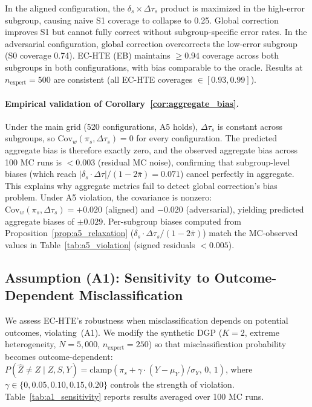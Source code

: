 In the aligned configuration, the $\delta_s \times \Delta\tau_s$ product is maximized in the high-error subgroup, causing naive S1 coverage to collapse to 0.25.
Global correction improves S1 but cannot fully correct without subgroup-specific error rates.
In the adversarial configuration, global correction overcorrects the low-error subgroup (S0 coverage 0.74).
EC-HTE (EB) maintains $\geq 0.94$ coverage across both subgroups in both configurations, with bias comparable to the oracle.
Results at $n_{\text{expert}}{=}500$ are consistent (all EC-HTE coverages $\in [0.93, 0.99]$).

\paragraph{Empirical validation of Corollary~\ref{cor:aggregate_bias}.}
Under the main grid (520 configurations, A5 holds), $\Delta\tau_s$ is constant across subgroups, so $\mathrm{Cov}_w(\pi_s, \Delta\tau_s) = 0$ for every configuration.
The predicted aggregate bias is therefore exactly zero, and the observed aggregate bias across 100 MC runs is $< 0.003$ (residual MC noise), confirming that subgroup-level biases (which reach $|\delta_s \cdot \Delta\tau|/(1-2\bar{\pi}) = 0.071$) cancel perfectly in aggregate.
This explains why aggregate metrics fail to detect global correction's bias problem.
Under A5 violation, the covariance is nonzero: $\mathrm{Cov}_w(\pi_s, \Delta\tau_s) = +0.020$ (aligned) and $-0.020$ (adversarial), yielding predicted aggregate biases of $\pm 0.029$.
Per-subgroup biases computed from Proposition~\ref{prop:a5_relaxation} ($\delta_s \cdot \Delta\tau_s / (1{-}2\bar{\pi})$) match the MC-observed values in Table~\ref{tab:a5_violation} (signed residuals $< 0.005$).

\subsection{Assumption (A1): Sensitivity to Outcome-Dependent Misclassification}
\label{app:a1_sensitivity}

We assess EC-HTE's robustness when misclassification depends on potential outcomes, violating~(A1).
We modify the synthetic DGP ($K{=}2$, extreme heterogeneity, $N{=}5{,}000$, $n_{\text{expert}}{=}250$) so that misclassification probability becomes outcome-dependent: $P(\hat{Z}{\neq}Z \mid Z, S, Y) = \mathrm{clamp}(\pi_s + \gamma \cdot (Y - \mu_Y)/\sigma_Y,\, 0,\, 1)$, where $\gamma \in \{0, 0.05, 0.10, 0.15, 0.20\}$ controls the strength of violation.
Table~\ref{tab:a1_sensitivity} reports results averaged over 100 MC runs.

